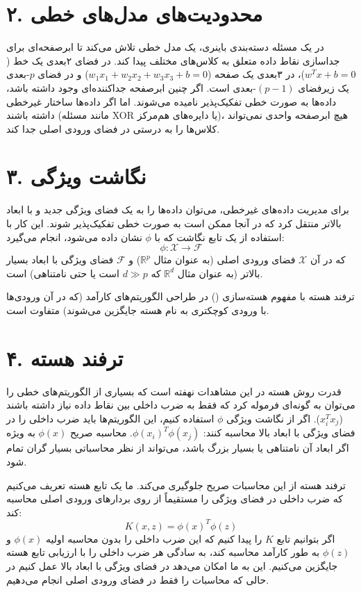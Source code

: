 \documentclass{article}
\begin{document}
\section*{۲. محدودیت‌های مدل‌های خطی}
در یک مسئله دسته‌بندی باینری، یک مدل خطی تلاش می‌کند تا ابرصفحه‌ای برای جداسازی نقاط داده متعلق به کلاس‌های مختلف پیدا کند. در فضای ۲بعدی یک خط ($w^T x + b = 0$)، در ۳بعدی یک صفحه ($w_1 x_1 + w_2 x_2 + w_3 x_3 + b = 0$) و در فضای $p$-بعدی یک زیرفضای $(p-1)$-بعدی است. اگر چنین ابرصفحه جداکننده‌ای وجود داشته باشد، داده‌ها به صورت خطی تفکیک‌پذیر نامیده می‌شوند. اما اگر داده‌ها ساختار غیرخطی داشته باشند (مانند مسئله XOR یا دایره‌های هم‌مرکز)، هیچ ابرصفحه واحدی نمی‌تواند کلاس‌ها را به درستی در فضای ورودی اصلی جدا کند.

\section*{۳. نگاشت ویژگی}
برای مدیریت داده‌های غیرخطی، می‌توان داده‌ها را به یک فضای ویژگی جدید و با ابعاد بالاتر منتقل کرد که در آنجا ممکن است به صورت خطی تفکیک‌پذیر شوند. این کار با استفاده از یک تابع نگاشت که با $\phi$ نشان داده می‌شود، انجام می‌گیرد:
\[
\phi: \mathcal{X} \to \mathcal{F}
\]
که در آن $\mathcal{X}$ فضای ورودی اصلی (به عنوان مثال $\mathbb{R}^p$) و $\mathcal{F}$ فضای ویژگی با ابعاد بسیار بالاتر (به عنوان مثال $\mathbb{R}^d$ که $d \gg p$ است یا حتی نامتناهی) است.

ترفند هسته با مفهوم هسته‌سازی () در طراحی الگوریتم‌های کارآمد (که در آن ورودی‌ها با ورودی کوچکتری به نام هسته جایگزین می‌شوند) متفاوت است.

\section*{۴. ترفند هسته}
قدرت روش هسته در این مشاهدات نهفته است که بسیاری از الگوریتم‌های خطی را می‌توان به گونه‌ای فرموله کرد که فقط به ضرب داخلی بین نقاط داده نیاز داشته باشند ($x_i^T x_j$).
اگر از نگاشت ویژگی $\phi$ استفاده کنیم، این الگوریتم‌ها باید ضرب داخلی را در فضای ویژگی با ابعاد بالا محاسبه کنند: $\phi(x_i)^T \phi(x_j)$. محاسبه صریح $\phi(x)$ به ویژه اگر ابعاد آن نامتناهی یا بسیار بزرگ باشد، می‌تواند از نظر محاسباتی بسیار گران تمام شود.

ترفند هسته از این محاسبات صریح جلوگیری می‌کند. ما یک تابع هسته تعریف می‌کنیم که ضرب داخلی در فضای ویژگی را مستقیماً از روی بردارهای ورودی اصلی محاسبه کند:
\[
K(x, z) = \phi(x)^T \phi(z)
\]
اگر بتوانیم تابع $K$ را پیدا کنیم که این ضرب داخلی را بدون محاسبه اولیه $\phi(x)$ و $\phi(z)$ به طور کارآمد محاسبه کند، به سادگی هر ضرب داخلی را با ارزیابی تابع هسته جایگزین می‌کنیم. این به ما امکان می‌دهد در فضای ویژگی با ابعاد بالا عمل کنیم در حالی که محاسبات را فقط در فضای ورودی اصلی انجام می‌دهیم.
\end{document}
